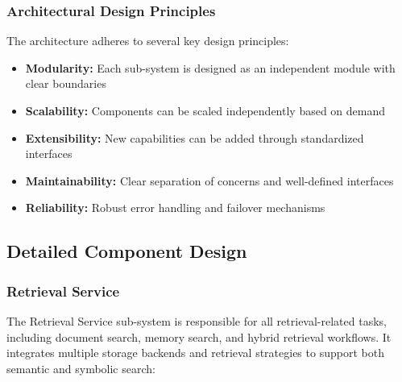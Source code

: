 \documentclass[../Main.tex]{subfiles}
\begin{document}
	\subsubsection{Architectural Design Principles}
	\label{section:4.1.2.3_architectural_design_principles} The architecture adheres
	to several key design principles:

	\begin{itemize}
		\item \textbf{Modularity:} Each sub-system is designed as an independent
			module with clear boundaries

		\item \textbf{Scalability:} Components can be scaled independently based on
			demand

		\item \textbf{Extensibility:} New capabilities can be added through
			standardized interfaces

		\item \textbf{Maintainability:} Clear separation of concerns and well-defined
			interfaces

		\item \textbf{Reliability:} Robust error handling and failover mechanisms
	\end{itemize}

	\subsection{Detailed Component Design}
	\label{section:4.1.3_detailed_component_design}
	\subsubsection{Retrieval Service}
	\label{section:4.1.3.1_retrieval_service} The Retrieval Service sub-system is
	responsible for all retrieval-related tasks, including document search, memory
	search, and hybrid retrieval workflows. It integrates multiple storage
	backends and retrieval strategies to support both semantic and symbolic search:
\end{document}
